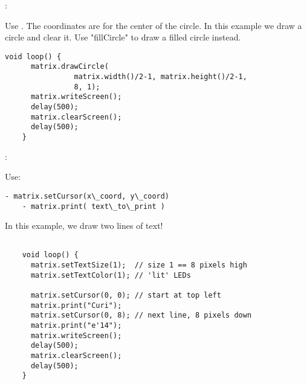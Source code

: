 \begin{minipage}[t]{0.49\tw}
  \vspace{0.0in}

  :
  \vspace{0.1in}

  Use . The coordinates are
for the center of the circle. In this example we draw a circle and clear it.
Use "fillCircle" to draw a filled circle instead.

  \begin{Verbatim}[gobble=3,fontsize=\small]
    void loop() {
      matrix.drawCircle(
                matrix.width()/2-1, matrix.height()/2-1,
                8, 1);
      matrix.writeScreen();
      delay(500);
      matrix.clearScreen();
      delay(500);
    }
  \end{Verbatim}

  :
  \vspace{0.1in}

  Use:
  \begin{Verbatim}[gobble=3,fontsize=\small]
    - matrix.setCursor(x\_coord, y\_coord)
    - matrix.print( text\_to\_print )
  \end{Verbatim}

  In this example, we draw two lines of text!

  \begin{Verbatim}[gobble=3,fontsize=\small]

    void loop() {
      matrix.setTextSize(1);  // size 1 == 8 pixels high
      matrix.setTextColor(1); // 'lit' LEDs

      matrix.setCursor(0, 0); // start at top left
      matrix.print("Curi");
      matrix.setCursor(0, 8); // next line, 8 pixels down
      matrix.print("e'14");
      matrix.writeScreen();
      delay(500);
      matrix.clearScreen();
      delay(500);
    }
  \end{Verbatim}
\end{minipage}

